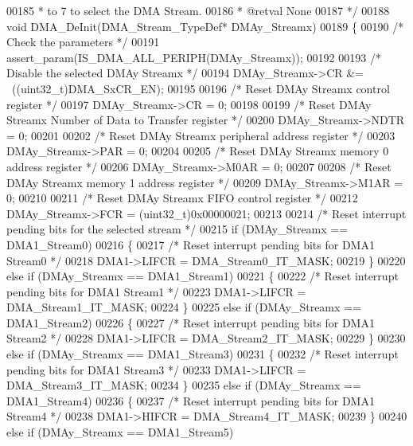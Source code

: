 \begin{DoxyCode}
00185 \textcolor{comment}{  *         to 7 to select the DMA Stream.}
00186 \textcolor{comment}{  * @retval None}
00187 \textcolor{comment}{  */}
00188 \textcolor{keywordtype}{void} DMA_DeInit(DMA\_Stream\_TypeDef* DMAy\_Streamx)
00189 \{
00190   \textcolor{comment}{/* Check the parameters */}
00191   assert_param(IS\_DMA\_ALL\_PERIPH(DMAy\_Streamx));
00192 
00193   \textcolor{comment}{/* Disable the selected DMAy Streamx */}
00194   DMAy\_Streamx->CR &= ~((uint32\_t)DMA_SxCR_EN);
00195 
00196   \textcolor{comment}{/* Reset DMAy Streamx control register */}
00197   DMAy\_Streamx->CR  = 0;
00198 
00199   \textcolor{comment}{/* Reset DMAy Streamx Number of Data to Transfer register */}
00200   DMAy\_Streamx->NDTR = 0;
00201 
00202   \textcolor{comment}{/* Reset DMAy Streamx peripheral address register */}
00203   DMAy\_Streamx->PAR  = 0;
00204 
00205   \textcolor{comment}{/* Reset DMAy Streamx memory 0 address register */}
00206   DMAy\_Streamx->M0AR = 0;
00207 
00208   \textcolor{comment}{/* Reset DMAy Streamx memory 1 address register */}
00209   DMAy\_Streamx->M1AR = 0;
00210 
00211   \textcolor{comment}{/* Reset DMAy Streamx FIFO control register */}
00212   DMAy\_Streamx->FCR = (uint32\_t)0x00000021;
00213 
00214   \textcolor{comment}{/* Reset interrupt pending bits for the selected stream */}
00215   \textcolor{keywordflow}{if} (DMAy\_Streamx == DMA1_Stream0)
00216   \{
00217     \textcolor{comment}{/* Reset interrupt pending bits for DMA1 Stream0 */}
00218     DMA1->LIFCR = DMA_Stream0_IT_MASK;
00219   \}
00220   \textcolor{keywordflow}{else} \textcolor{keywordflow}{if} (DMAy\_Streamx == DMA1_Stream1)
00221   \{
00222     \textcolor{comment}{/* Reset interrupt pending bits for DMA1 Stream1 */}
00223     DMA1->LIFCR = DMA_Stream1_IT_MASK;
00224   \}
00225   \textcolor{keywordflow}{else} \textcolor{keywordflow}{if} (DMAy\_Streamx == DMA1_Stream2)
00226   \{
00227     \textcolor{comment}{/* Reset interrupt pending bits for DMA1 Stream2 */}
00228     DMA1->LIFCR = DMA_Stream2_IT_MASK;
00229   \}
00230   \textcolor{keywordflow}{else} \textcolor{keywordflow}{if} (DMAy\_Streamx == DMA1_Stream3)
00231   \{
00232     \textcolor{comment}{/* Reset interrupt pending bits for DMA1 Stream3 */}
00233     DMA1->LIFCR = DMA_Stream3_IT_MASK;
00234   \}
00235   \textcolor{keywordflow}{else} \textcolor{keywordflow}{if} (DMAy\_Streamx == DMA1_Stream4)
00236   \{
00237     \textcolor{comment}{/* Reset interrupt pending bits for DMA1 Stream4 */}
00238     DMA1->HIFCR = DMA_Stream4_IT_MASK;
00239   \}
00240   \textcolor{keywordflow}{else} \textcolor{keywordflow}{if} (DMAy\_Streamx == DMA1_Stream5)

\end{DoxyCode}
